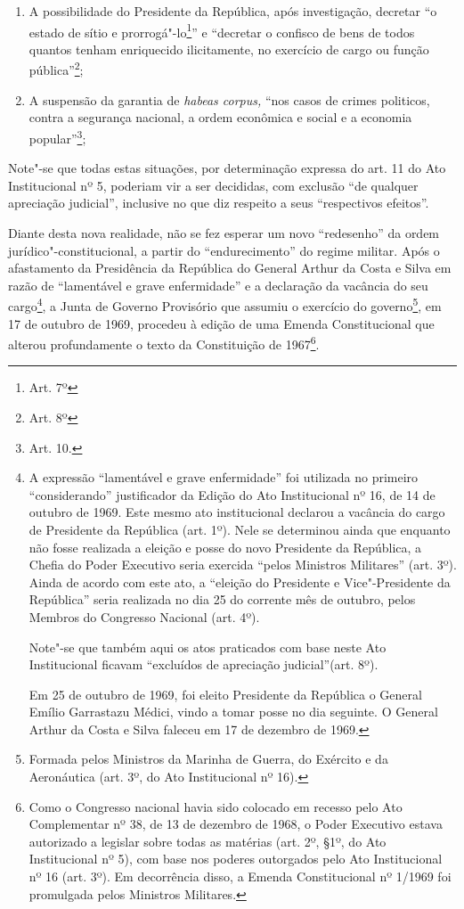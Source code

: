 \begin{enumerate}
\item{}A possibilidade do Presidente da República, após investigação,
decretar ``o estado de sítio e prorrogá"-lo\footnote{Art. 7º}'' e
``decretar o confisco de bens de todos quantos tenham enriquecido
ilicitamente, no exercício de cargo ou função pública''\footnote{Art.
  8º};

\item{}A suspensão da garantia de \emph{habeas corpus,} ``nos casos de
crimes politicos, contra a segurança nacional, a ordem econômica e
social e a economia popular''\footnote{Art. 10.};
\end{enumerate}

Note"-se que todas estas situações, por determinação expressa do art. 11
do Ato Institucional nº 5, poderiam vir a ser decididas, com
exclusão ``de qualquer apreciação judicial'', inclusive no que
diz respeito a seus ``respectivos efeitos''.

Diante desta nova realidade, não se fez esperar um novo ``redesenho'' da
ordem jurídico"-constitucional, a partir do ``endurecimento'' do regime
militar. Após o afastamento da Presidência da República do General
Arthur da Costa e Silva em razão de ``lamentável e grave
enfermidade'' e a declaração da vacância do seu cargo\footnote{A
  expressão ``lamentável e grave enfermidade'' foi utilizada no
  primeiro ``considerando'' justificador da Edição do Ato Institucional
  nº 16, de 14 de outubro de 1969. Este mesmo ato institucional declarou
  a vacância do cargo de Presidente da República (art. 1º). Nele se
  determinou ainda que enquanto não fosse realizada a eleição e posse do
  novo Presidente da República, a Chefia do Poder Executivo seria
  exercida ``pelos Ministros Militares'' (art. 3º). Ainda de
  acordo com este ato, a ``eleição do Presidente e Vice"-Presidente
  da República'' seria realizada no dia 25 do corrente mês de outubro,
  pelos Membros do Congresso Nacional (art. 4º).

  Note"-se que também aqui os atos praticados com base neste Ato
  Institucional ficavam ``excluídos de apreciação judicial''(art.
  8º).

  Em 25 de outubro de 1969, foi eleito Presidente da República o General
  Emílio Garrastazu Médici, vindo a tomar posse no dia seguinte. O
  General Arthur da Costa e Silva faleceu em 17 de dezembro de 1969.}, a
Junta de Governo Provisório que assumiu o exercício do governo\footnote{Formada
  pelos Ministros da Marinha de Guerra, do Exército e da Aeronáutica
  (art. 3º, do Ato Institucional nº 16).}, em 17 de outubro de 1969,
procedeu à edição de uma Emenda Constitucional que alterou profundamente
o texto da Constituição de 1967\footnote{Como o Congresso nacional havia
  sido colocado em recesso pelo Ato Complementar nº 38, de 13 de
  dezembro de 1968, o Poder Executivo estava autorizado a legislar sobre
  todas as matérias (art. 2º, §1º, do Ato Institucional nº 5), com base
  nos poderes outorgados pelo Ato Institucional nº 16 (art. 3º). Em
  decorrência disso, a Emenda Constitucional nº 1/1969 foi promulgada
  pelos Ministros Militares.}.

